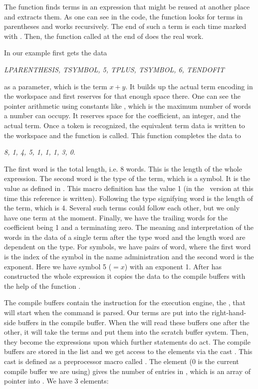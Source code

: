 The function  finds terms in an expression that might
be reused at another place and extracts them. As one can see in the code, the
function looks for terms in parentheses and works recursively. The end of such a
term is each time marked with . Then, the function
 called at the end of  does the
real work.

In our example  first gets the data
\begin{center}
{\it LPARENTHESIS, TSYMBOL, 5, TPLUS, TSYMBOL, 6, TENDOFIT}
\end{center}
as a parameter, which is the term $x+y$. It builds up the actual term encoding
in the workspace and first reserves for that enough space there. One can see the
pointer arithmetic using constants like , which is the maximum
number of words a number can occupy. It reserves space for the coefficient, an
integer, and the actual term. Once a token is recognized, the equivalent term
data is written to the workspace and the function  is called.
This function completes the data to
\begin{center}
{\it 8, 1, 4, 5, 1, 1, 1, 3, 0}. 
\end{center}
The first word is the total length, i.e. 8 words. This is the length of the
whole expression. The second word is the type of the term, which is a symbol. It
is the value  as defined in . This macro definition
 has the value 1 (in the \FORM\ version at this time this reference is
written). Following the type signifying word is the length of the term, which is
4. Several such terms could follow each other, but we only have one term at the
moment. Finally, we have the trailing words for the coefficient being 1 and a
terminating zero. The meaning and interpretation of the words in the data of a
single term after the type word and the length word are dependent on the type.
For symbols, we have pairs of word, where the first word is the index of the
symbol in the name administration and the second word is the exponent. Here we
have symbol 5 ($ = x$) with an exponent 1.  After  has
constructed the whole expression it copies the data to the compile buffers with
the help of the function .

The compile buffers contain the instruction for the execution engine, the
, that will start when the  command is parsed. Our terms
are put into the right-hand-side buffers in the compile buffer. When the
 will read these buffers one after the other, it will take the
terms and put them into the scratch buffer system. Then, they become the
expressions upon which further statements do act. The compile buffers are stored
in the list  and we get access to the elements via the cast
. This cast is defined as a preprocessor macro
called . The element  (0 is the current compile
buffer we are using) gives the number of entries in , which is
an array of pointer into . We have 3 elements:

